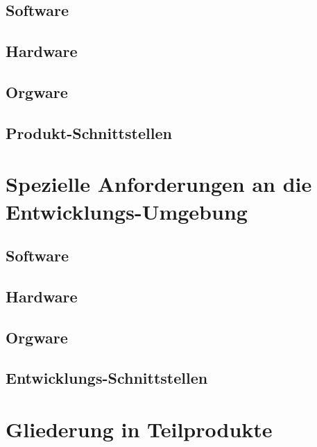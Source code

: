 \documentclass[12pt, a4paper]{article}
\begin{document}
\subsection{Software}
\subsection{Hardware}
\subsection{Orgware}
\subsection{Produkt-Schnittstellen}
\pagebreak

\section{Spezielle Anforderungen an die Entwicklungs-Umgebung}
\subsection{Software}
\subsection{Hardware}
\subsection{Orgware}
\subsection{Entwicklungs-Schnittstellen}
\pagebreak

\section{Gliederung in Teilprodukte}
\pagebreak
\end{document}
